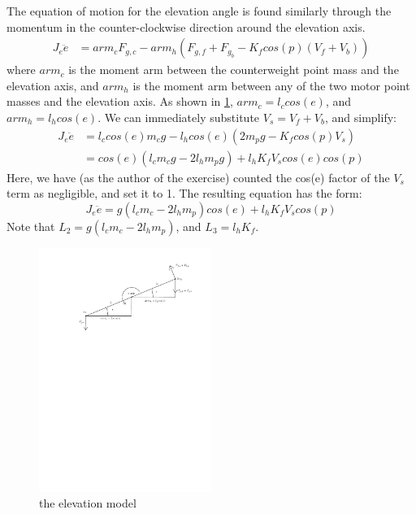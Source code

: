 The equation of motion for the elevation angle is found similarly through the momentum in the counter-clockwise direction around the elevation axis.
\begin{align*}
J_e\ddot{e} &= arm_cF_{g,c} - arm_h(F_{g,f}+F_{g_b} - K_fcos(p)(V_f + V_b))
\end{align*}
where $arm_c$ is the moment arm between the counterweight point mass and the elevation axis, and $arm_h$ is the moment arm between any of the two motor point masses and the elevation axis. As shown in \cref{fig:elevation_model}, $arm_c = l_ccos(e)$, and $arm_h = l_hcos(e)$.  We can immediately substitute $V_s = V_f + V_b$, and simplify:
\begin{align*}
J_e\ddot{e} &= l_ccos(e)m_cg - l_hcos(e)(2m_pg - K_fcos(p)V_s) \\
						&= cos(e)(l_cm_cg - 2l_hm_pg) + l_hK_fV_scos(e)cos(p)
\end{align*}
 Here, we have (as the author of the exercise) counted the cos(e) factor of the $V_s$ term as negligible, and set it to 1.  The resulting equation has the form:
\begin{equation}
J_e\ddot{e} = g(l_cm_c - 2l_hm_p)cos(e) + l_hK_fV_scos(p)
\end{equation}
Note that $L_2 = g(l_cm_c-2l_hm_p)$, and $L_3 = l_hK_f$.

\begin{figure}[H]
  \caption{the elevation model}
  \label{fig:elevation_model}
  \includegraphics[width=0.5\textwidth]{images/elevation_model}
\end{figure}

